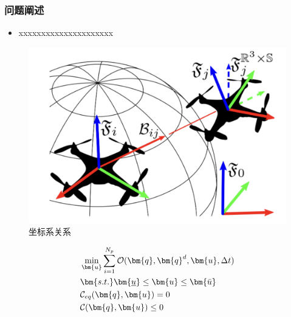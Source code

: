 \documentclass{beamer}
\theoremstyle{remark}
\begin{document}
\begin{frame}
	\frametitle{问题阐述}
	\begin{itemize}
		\item  xxxxxxxxxxxxxxxxxxxxx
	\end{itemize}
	\begin{minipage}[c]{0.5\textwidth} 
		\begin{figure}[H]
			\centering
			\includegraphics[width=1\linewidth]{Fig/f10.png}
			\caption{坐标系关系}
		\end{figure}
	\end{minipage}%
	\begin{minipage}[c]{0.5\textwidth}
		\centering
		\begin{equation}
			\begin{aligned}
				&\min_{\bm{u}} \sum_{i=1}^{N_{p}}{\cal O}(\bm{q},\bm{q}^{d},{\bm{u}},\Delta t)  \\
				&\bm{s.t.} \bm{\underline{u}}\leq\bm{u}\leq\bm{\bar{u}}  \\
				&{\mathcal{C}}_{eq}(\bm{q},\bm{u})=0 \\
				&{\mathcal{C}(\bm{q},\bm{u})}{{}\leq0}
			\end{aligned}
			\label{equ_mpc}
		\end{equation}
	\end{minipage}
	
\end{frame}
\end{document}
